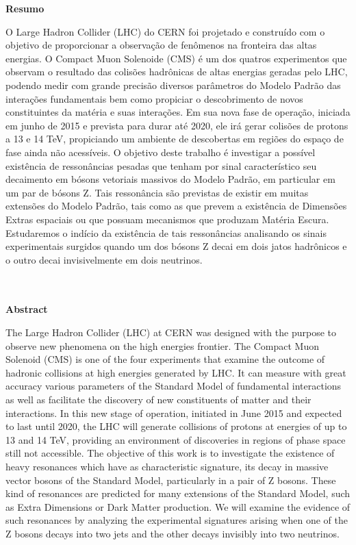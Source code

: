 
\begin{center}
{\large\textbf{Resumo}}
\end{center}
O Large Hadron Collider (LHC) do CERN foi projetado e construído com o objetivo de proporcionar a observação de fenômenos na fronteira das altas energias. O Compact Muon Solenoide (CMS) é um dos quatros experimentos que observam o resultado das colisões hadrônicas de altas energias geradas pelo LHC, podendo medir com grande precisão diversos parâmetros do Modelo Padrão das interações fundamentais bem como propiciar o descobrimento de novos constituintes da matéria e suas interações. Em sua nova fase de operação, iniciada em junho de 2015 e prevista para durar até 2020, ele irá gerar colisões de protons a 13 e 14 TeV, propiciando um ambiente de descobertas em regiões do espaço de fase ainda não acessíveis. O objetivo deste trabalho é investigar a possível existência de ressonâncias pesadas que tenham por sinal característico seu decaimento em bósons vetoriais massivos do Modelo Padrão, em particular em um par de bósons Z. Tais ressonância são previstas de existir em muitas extensões do Modelo Padrão, tais como as que prevem a existência de Dimensões Extras espaciais ou que possuam mecanismos que produzam Matéria Escura. Estudaremos o indício da existência de tais ressonâncias analisando os sinais experimentais surgidos quando um dos bósons Z decai em dois jatos hadrônicos e o outro decai invisivelmente em dois neutrinos.\\\\\\

\begin{center}
{\large\textbf{Abstract}}
\end{center}
The Large Hadron Collider (LHC) at CERN was designed with the purpose to observe new phenomena on the high energies frontier. The Compact Muon Solenoid (CMS) is one of the four experiments that examine the outcome of hadronic collisions at high energies generated by LHC. It can measure with great accuracy various parameters of the Standard Model of fundamental interactions as well as facilitate the discovery of new constituents of matter and their interactions.
In this new stage of operation, initiated in June 2015 and expected to last until 2020, the LHC will generate collisions of protons at energies of up to 13 and 14 TeV, providing an environment of discoveries in regions of phase space still not accessible. The objective of this work is to investigate the existence of heavy resonances which have as characteristic signature, its decay in massive vector bosons of the Standard Model, particularly in a pair of Z bosons.
These kind of resonances are predicted for many extensions of the Standard Model, such as Extra Dimensions or Dark Matter production. We will examine the evidence of such resonances by analyzing the experimental signatures arising when one of the Z bosons decays into two jets and the other decays invisibly into two neutrinos.

